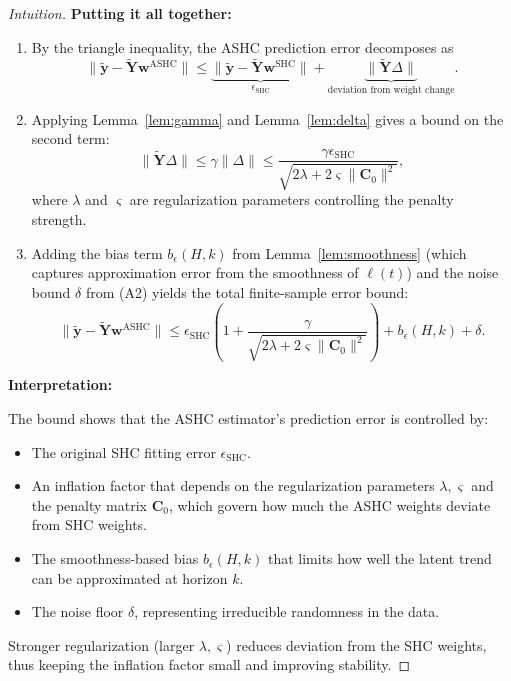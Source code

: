 \documentclass{article}
\begin{document}
\begin{proof}[Intuition]
\vspace{0.5em}

\noindent
\textbf{Putting it all together:}

\begin{enumerate}

\item By the triangle inequality, the ASHC prediction error decomposes as
\[
\|\widetilde{\mathbf{y}} - \widetilde{\mathbf{Y}}\mathbf{w}^{\text{ASHC}}\|
\leq
\underbrace{\|\widetilde{\mathbf{y}} - \widetilde{\mathbf{Y}}\mathbf{w}^{\text{SHC}}\|}_{\epsilon_{\text{SHC}}} + \underbrace{\|\widetilde{\mathbf{Y}} \Delta\|}_{\text{deviation from weight change}}.
\]

\item Applying Lemma~\ref{lem:gamma} and Lemma~\ref{lem:delta} gives a bound on the second term:
\[
\|\widetilde{\mathbf{Y}}\Delta\| \leq \gamma \|\Delta\| \leq \frac{\gamma \epsilon_{\text{SHC}}}{\sqrt{2\lambda + 2\varsigma \|\mathbf{C}_0\|^2}},
\]
where \(\lambda\) and \(\varsigma\) are regularization parameters controlling the penalty strength.

\item Adding the bias term \(b_\epsilon(H,k)\) from Lemma~\ref{lem:smoothness} (which captures approximation error from the smoothness of \(\ell(t)\)) and the noise bound \(\delta\) from (A2) yields the total finite-sample error bound:
\[
\|\widetilde{\mathbf{y}} - \widetilde{\mathbf{Y}} \mathbf{w}^{\text{ASHC}}\|
\leq
\epsilon_{\text{SHC}} \left(1 + \frac{\gamma}{\sqrt{2\lambda + 2\varsigma \|\mathbf{C}_0\|^2}} \right)
+ b_\epsilon(H,k) + \delta.
\]

\end{enumerate}

\vspace{0.5em}

\noindent
\textbf{Interpretation:} 

The bound shows that the ASHC estimator's prediction error is controlled by:

\begin{itemize}
\item The original SHC fitting error \(\epsilon_{\text{SHC}}\).

\item An inflation factor that depends on the regularization parameters \(\lambda, \varsigma\) and the penalty matrix \(\mathbf{C}_0\), which govern how much the ASHC weights deviate from SHC weights.

\item The smoothness-based bias \(b_\epsilon(H,k)\) that limits how well the latent trend can be approximated at horizon \(k\).

\item The noise floor \(\delta\), representing irreducible randomness in the data.

\end{itemize}

Stronger regularization (larger \(\lambda, \varsigma\)) reduces deviation from the SHC weights, thus keeping the inflation factor small and improving stability.

\end{proof}
\end{document}
